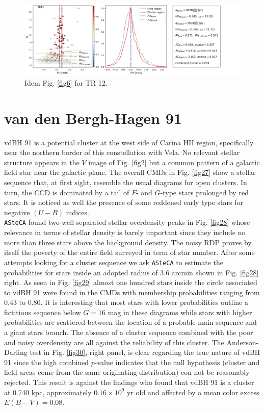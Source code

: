 \documentclass[draft]{aa}
\begin{document}
\begin{figure}[ht]
    \centering
    \includegraphics[width=\hsize]{../figs/plx_TR12.png}
    \caption{Idem Fig. \ref{fig6} for TR 12.}
    \label{fig22}
\end{figure}



\section{van den Bergh-Hagen 91}

vdBH 91 is a potential cluster at the west side of Carina HII
region, specifically near the northern border of this constellation with Vela.
No relevant stellar structure appears in the $V$ image of Fig. \ref{fig2} but a
common pattern of a galactic field star near the galactic plane. The overall
CMDs in Fig. \ref{fig27} show a stellar sequence that, at first sight, resemble
the usual diagrams for open clusters. In turn, the CCD
is dominated by a tail of $F$- and $G$-type stars prolonged by red stars. It is
noticed as well the presence of some reddened early type stars for negative
$(U-B)$ indices.\\

\texttt{ASteCA} found two well separated stellar overdensity peaks in Fig.
\ref{fig28} whose relevance in terms of stellar density is barely important
since they include no more than three stars above the background density. The
noisy RDP proves by itself the poverty of the entire field surveyed in term of
star number. After some attempts looking for a cluster sequence we ask
\texttt{ASteCA} to estimate the probabilities for stars inside an adopted radius
of 3.6 arcmin shown in Fig. \ref{fig28} right. As seen in Fig. \ref{fig29}
almost one hundred stars inside the circle associated to vdBH 91 were
found in the CMDs with membership probabilities ranging from 0.43 to 0.80.
It is interesting that most stars with lower probabilities outline a fictitious
sequence below $G=16$ mag in these diagrams while stars with higher
probabilities are scattered between the location of a probable main sequence and
a giant stars branch. The absence of a cluster sequence combined with the
poor and noisy overdensity are all against the reliability of this cluster.
%
The Anderson-Darling test in Fig. \ref{fig30}, right panel, is clear regarding
the true nature of vdBH 91 since the high combined $p$-value
indicates that the null hypothesis (cluster and field areas come from the same
originating distribution) con not be reasonably rejected. This result is against
the \cite{Kharchenko_2005} findings who found that vdBH 91 is a cluster at
0.740 kpc, approximately $0.16\times10^9$ yr old and affected by a mean color
excess $E(B-V) = 0.08$.\\
\end{document}
